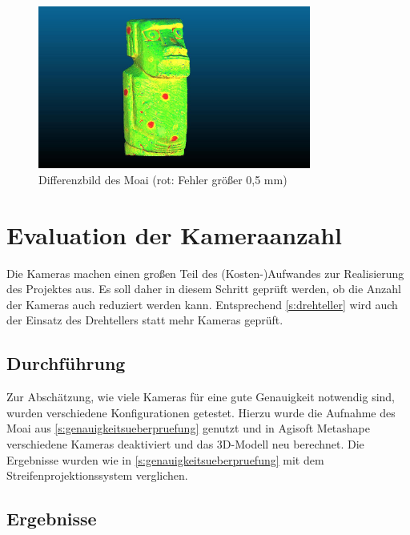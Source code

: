 \documentclass[./00PhotoBox.tex]{subfiles}
\begin{document}
\begin{figure}
    \centering
    \includegraphics[width=0.8\textwidth]{img/moai_fehler_drehteller.jpg}
    \caption{Differenzbild des Moai (rot: Fehler größer 0,5 mm)}
    \label{img:drehteller_moai_fehler}
\end{figure}



\section{Evaluation der Kameraanzahl}
\label{s:kameraanzahl}
Die Kameras machen einen großen Teil des (Kosten-)Aufwandes zur Realisierung des Projektes aus. Es soll daher in diesem Schritt geprüft werden, ob die Anzahl der Kameras auch reduziert werden kann. Entsprechend \autoref{s:drehteller} wird auch der Einsatz des Drehtellers statt mehr Kameras geprüft.

\subsection{Durchführung}
Zur Abschätzung, wie viele Kameras für eine gute Genauigkeit notwendig sind, wurden verschiedene Konfigurationen getestet. Hierzu wurde die Aufnahme des Moai aus \autoref{s:genauigkeitsueberpruefung} genutzt und in Agisoft Metashape verschiedene Kameras deaktiviert und das 3D-Modell neu berechnet. Die Ergebnisse wurden wie in \autoref{s:genauigkeitsueberpruefung} mit dem Streifenprojektionssystem verglichen.

\subsection{Ergebnisse}



\biblio
\end{document}
